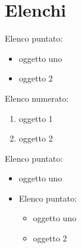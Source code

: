 \chapter{Elenchi}
\label{chap:elenchi}

Elenco puntato:
\begin{itemize}
    \item oggetto uno
    \item oggetto 2
\end{itemize}
\noindent
Elenco numerato:
\begin{enumerate}
    \item oggetto 1
    \item oggetto 2
\end{enumerate}
\noindent
Elenco puntato:
\begin{itemize}
    \item oggetto uno
    \item 
    Elenco puntato:
    \begin{itemize}
        \item oggetto uno
        \item oggetto 2
    \end{itemize}
\end{itemize}